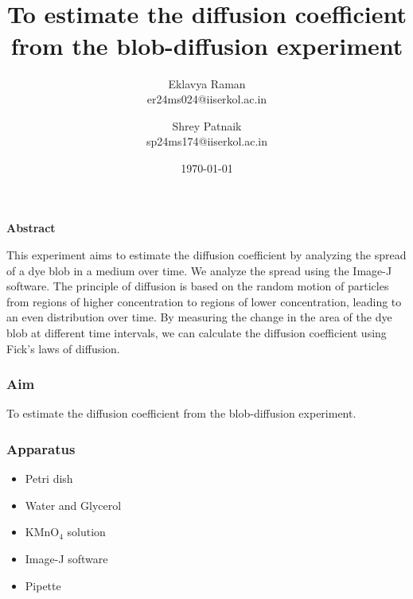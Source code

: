\documentclass[openany]{book}
\begin{document}
\title{\Large{} \\ \vspace{5pt}
\large{To estimate the diffusion coefficient from the blob-diffusion experiment}}
\author{Eklavya Raman \\ \vspace{5pt} er24ms024@iiserkol.ac.in \\ \vspace{5pt}
\and Shrey Patnaik \\ \vspace{5pt} sp24ms174@iiserkol.ac.in \\ \vspace{5pt}}
\date{\today}
\maketitle
\begin{center}
    \textbf{Abstract}
\end{center}
    This experiment aims to estimate the diffusion coefficient by analyzing the spread of a dye blob in a medium over time. We analyze the spread using the Image-J software. The principle of diffusion is based on the random motion of particles from regions of higher concentration to regions of lower concentration, leading to an even distribution over time. By measuring the change in the area of the dye blob at different time intervals, we can calculate the diffusion coefficient using Fick's laws of diffusion.
\subsubsection{Aim}
To estimate the diffusion coefficient from the blob-diffusion experiment.
\subsubsection{Apparatus}
\begin{itemize}
    \item Petri dish
    \item Water and Glycerol
    \item KMnO$_4$ solution
    \item Image-J software
    \item Pipette
\end{itemize}
\end{document}
